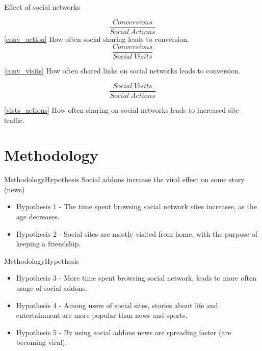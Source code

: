 \begin{frame}{Effect of social networks}
\begin{scriptsize}
    \begin{equation}
    \label{conv_action}
    \frac{Conversions}{Social\ Actions}
    \end{equation}
    \ref{conv_action} How often social sharing leads to conversion.
    \begin{equation}
\label{conv_visits}
\frac{Conversions}{Social\ Visits}
\end{equation}

\ref{conv_visits} How often shared links on social networks leads to conversion.
 
\begin{equation}
\label{vists_actions}
\frac{Social\ Visits}{Social\ Actions}
\end{equation}

\ref{vists_actions} How often sharing on social networks leads to increased site traffic.
\end{scriptsize}
\end{frame}

\section{Methodology}

\begin{frame}{Methodology}{Hypothesis}
    Social addons increase the viral effect on some story (news)
    \begin{itemize}
      \item Hypothesis 1 - The time spent browsing social network sites
      increases, as the age decreases.
      \item Hypothesis 2 - Social sites are mostly visited from home, with the
      purpose of keeping a friendship.      
    \end{itemize}
\end{frame}

\begin{frame}{Methodology}{Hypothesis}
    \begin{itemize}
      \item Hypothesis 3 - More time spent browsing social network, leads to more
often usage of social addons.
      \item Hypothesis 4 - Among users of social sites, stories about life and
      entertainment are more popular than news and sports.
      \item Hypothesis 5 - By using social addons news are spreading faster (are
becoming viral).
    \end{itemize}
\end{frame}

